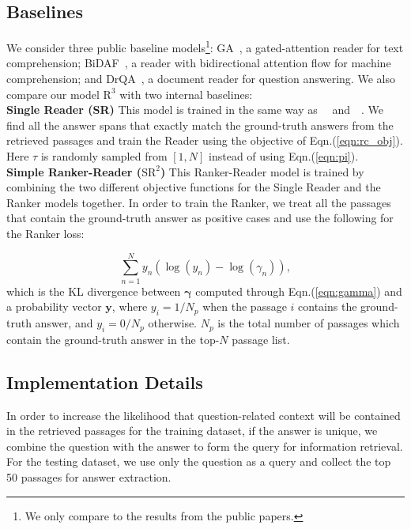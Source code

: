\documentclass[letterpaper]{article} \usepackage{aaai18}  \usepackage{times}  \usepackage{helvet}  \usepackage{courier}  \usepackage{url}  \usepackage{graphicx}  \usepackage{comment}
\begin{document}
\subsection{Baselines}
We consider three public baseline models\footnote{We only compare to the results from the public papers.}: GA~\cite{dhingra2016gated,dhingra2017quasar}, a gated-attention reader for text comprehension; BiDAF~\cite{seo2016bidirectional}, a reader with bidirectional attention flow for machine comprehension; and DrQA~\cite{chen2017reading}, a document reader for question answering. We also compare our model $\text{R}^3$ with two internal baselines:\\


\noindent \textbf{Single Reader (SR)}\quad 
This model is trained in the same way as~\citeauthor{chen2017reading}~\citeyear{chen2017reading} and~\citeauthor{dhingra2017quasar}~\citeyear{dhingra2017quasar}. We find all the answer spans that exactly match the ground-truth answers from the retrieved passages and train the  Reader using the objective of Eqn.(\ref{eqn:rc_obj}).  Here $\tau$ is randomly sampled from $[1,N]$ instead of using Eqn.(\ref{eqn:pi}).\\


\noindent \textbf{Simple Ranker-Reader ($\text{SR}^2$)}\quad
This Ranker-Reader model is trained by combining the two different objective functions for the Single Reader and the Ranker models together. In order to train the Ranker, we treat all the passages that contain the ground-truth answer as positive cases and use the following for the Ranker loss:


\begin{equation}
\sum_{n=1}^{N} y_n \left( \log(y_n) - \log(\gamma_n) \right),
\label{eqn:rank_obj_ideal}
\end{equation}
which is the KL divergence between $\mathbf{\gamma}$ computed through Eqn.(\ref{eqn:gamma}) and a probability vector $\mathbf{y}$, where $y_i = {1}/{N_p}$ when the passage $i$ contains the ground-truth answer, and $y_i = {0}/{N_p}$ otherwise.
$N_p$ is the total number of passages which contain the ground-truth answer in the top-$N$ passage list.
\subsection{Implementation Details}
In order to increase the likelihood that question-related context will be contained in the retrieved passages for the training dataset, if the answer is unique, we combine the question with the answer to form the query for
information retrieval. For the testing dataset, we use only the question as a query and collect the top 50 passages for answer extraction.
\end{document}
